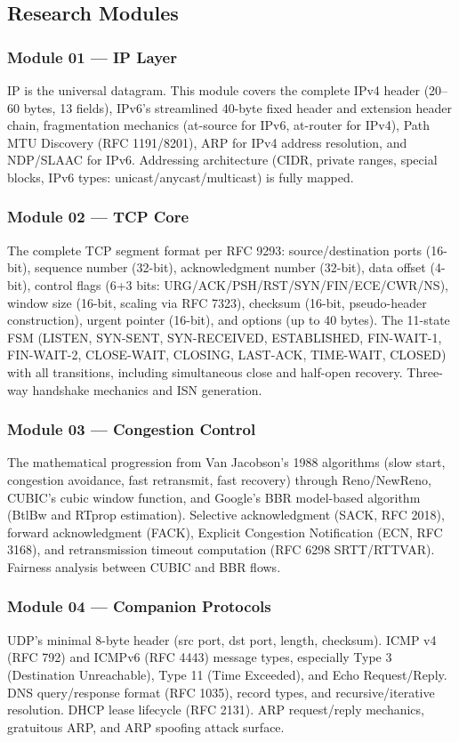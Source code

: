 \documentclass[11pt,letterpaper]{article}
\begin{document}
\subsection{Research Modules}

\subsubsection{Module 01 --- IP Layer}
IP is the universal datagram. This module covers the complete IPv4 header (20--60 bytes, 13 fields), IPv6's streamlined 40-byte fixed header and extension header chain, fragmentation mechanics (at-source for IPv6, at-router for IPv4), Path MTU Discovery (RFC 1191/8201), ARP for IPv4 address resolution, and NDP/SLAAC for IPv6. Addressing architecture (CIDR, private ranges, special blocks, IPv6 types: unicast/anycast/multicast) is fully mapped.

\subsubsection{Module 02 --- TCP Core}
The complete TCP segment format per RFC 9293: source/destination ports (16-bit), sequence number (32-bit), acknowledgment number (32-bit), data offset (4-bit), control flags (6+3 bits: URG/ACK/PSH/RST/SYN/FIN/ECE/CWR/NS), window size (16-bit, scaling via RFC 7323), checksum (16-bit, pseudo-header construction), urgent pointer (16-bit), and options (up to 40 bytes). The 11-state FSM (LISTEN, SYN-SENT, SYN-RECEIVED, ESTABLISHED, FIN-WAIT-1, FIN-WAIT-2, CLOSE-WAIT, CLOSING, LAST-ACK, TIME-WAIT, CLOSED) with all transitions, including simultaneous close and half-open recovery. Three-way handshake mechanics and ISN generation.

\subsubsection{Module 03 --- Congestion Control}
The mathematical progression from Van Jacobson's 1988 algorithms (slow start, congestion avoidance, fast retransmit, fast recovery) through Reno/NewReno, CUBIC's cubic window function, and Google's BBR model-based algorithm (BtlBw and RTprop estimation). Selective acknowledgment (SACK, RFC 2018), forward acknowledgment (FACK), Explicit Congestion Notification (ECN, RFC 3168), and retransmission timeout computation (RFC 6298 SRTT/RTTVAR). Fairness analysis between CUBIC and BBR flows.

\subsubsection{Module 04 --- Companion Protocols}
UDP's minimal 8-byte header (src port, dst port, length, checksum). ICMP v4 (RFC 792) and ICMPv6 (RFC 4443) message types, especially Type 3 (Destination Unreachable), Type 11 (Time Exceeded), and Echo Request/Reply. DNS query/response format (RFC 1035), record types, and recursive/iterative resolution. DHCP lease lifecycle (RFC 2131). ARP request/reply mechanics, gratuitous ARP, and ARP spoofing attack surface.
\end{document}
